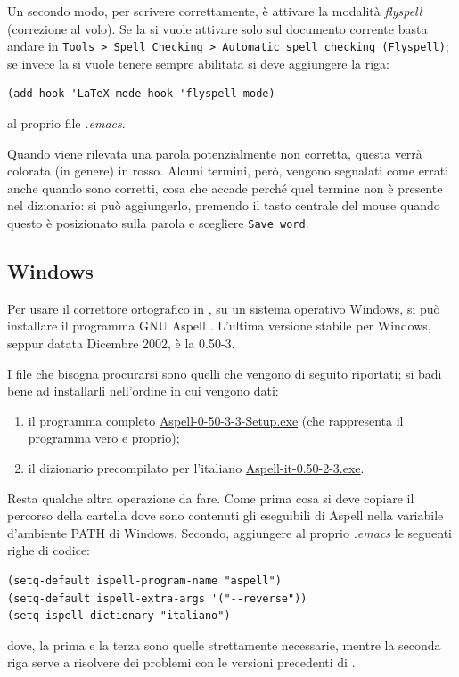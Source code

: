 \documentclass[11pt,a4paper]{article}
\begin{document}
Un secondo modo, per scrivere correttamente, è attivare la modalità
\emph{flyspell} (correzione al volo). Se la si vuole attivare solo sul documento
corrente basta andare in \texttt{Tools > Spell Checking > Automatic spell
  checking (Flyspell)}; se invece la si vuole tenere sempre abilitata si deve
aggiungere la riga:
\begin{Verbatim}
(add-hook 'LaTeX-mode-hook 'flyspell-mode)
\end{Verbatim}
al proprio file \emph{.emacs}.

Quando viene rilevata una parola potenzialmente non corretta, questa verrà
colorata (in genere) in rosso. Alcuni termini, però, vengono segnalati come
errati anche quando sono corretti, cosa che accade perché quel termine non è
presente nel dizionario: si può aggiungerlo, premendo il tasto centrale del
mouse quando questo è posizionato sulla parola e scegliere \texttt{Save word}.

\subsection{Windows}
\label{sec:aspellwin}

Per usare il correttore ortografico in \emacs, su un sistema operativo Windows,
si può installare il programma GNU Aspell
. L'ultima
versione stabile per Windows, seppur datata Dicembre 2002, è la 0.50-3.

I file che bisogna procurarsi sono quelli che vengono di seguito
riportati; si badi bene ad installarli nell'ordine in cui vengono
dati:

\begin{enumerate}
\item il programma completo
  \href{http://ftp.gnu.org/gnu/aspell/w32/Aspell-0-50-3-3-Setup.exe}%
  {Aspell-0-50-3-3-Setup.exe} (che rappresenta il programma
  vero e proprio);
\item il dizionario precompilato per l'italiano
  \href{http://ftp.gnu.org/gnu/aspell/w32/Aspell-it-0.50-2-3.exe}%
  {Aspell-it-0.50-2-3.exe}.
\end{enumerate}

Resta qualche altra operazione da fare. Come prima cosa si deve copiare il
percorso della cartella dove sono contenuti gli eseguibili di Aspell nella
variabile d'ambiente \textsf{PATH} di Windows. Secondo, aggiungere al proprio
\emph{.emacs} le seguenti righe di codice:
\begin{Verbatim}
(setq-default ispell-program-name "aspell")
(setq-default ispell-extra-args '("--reverse"))
(setq ispell-dictionary "italiano")
\end{Verbatim}
dove, la prima e la terza sono quelle strettamente necessarie, mentre la seconda
riga serve a risolvere dei problemi con le versioni precedenti di
\emacs. %
\end{document}
